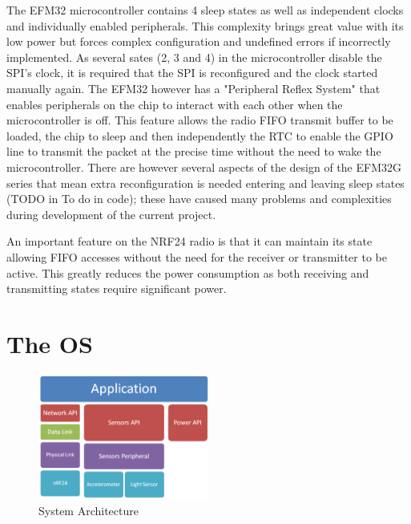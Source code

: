 The EFM32 microcontroller contains 4 sleep states as well as independent clocks and individually
enabled peripherals. This complexity brings great value with its low power but forces complex
configuration and undefined errors if incorrectly implemented. As several sates (2, 3 and 4) in the
microcontroller disable the \ac{SPI}'s clock, it is required that the SPI is reconfigured and the clock started
manually again. The EFM32 however has a "Peripheral Reflex System" that enables peripherals on
the chip to interact with each other when the microcontroller is off. This feature allows the radio
\ac{FIFO} transmit buffer to be loaded, the chip to sleep and then independently the
\ac{RTC} to enable the \ac{GPIO} line to transmit the packet at the precise
time without the need to wake the microcontroller. There are however several aspects of the design
of the EFM32G series\cite{Energy Micro AS, 2012} that mean extra reconfiguration is needed entering
and leaving sleep states (TODO in To do in code); these have caused many problems and
complexities during development of the current project.


An important feature on the \ac{NRF24} radio is that it can maintain its state allowing \ac{FIFO} accesses
without the need for the receiver or transmitter to be active. This greatly reduces the power
consumption as both receiving and transmitting states require significant power.


\section{The \acf{OS}}

\begin{figure}
  \vspace{-10pt}
  \begin{center}
    \includegraphics[width=0.5\textwidth, keepaspectratio=true]{images/archatechture.png}
  \end{center}
  \caption[System Architecture]{System Architecture}
  \vspace{-10pt}
\end{figure}

